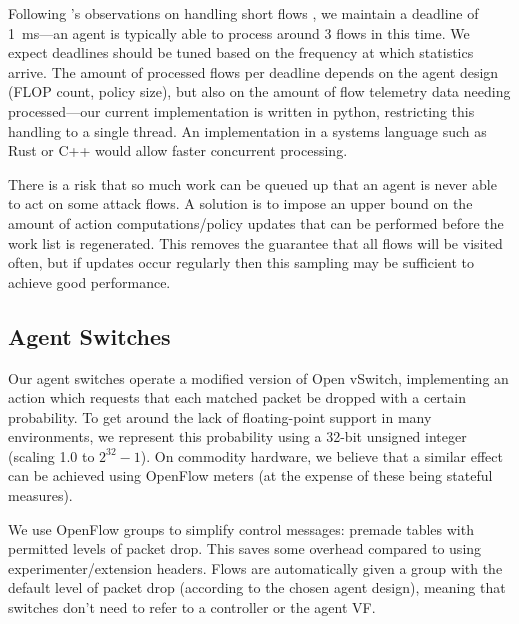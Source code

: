 \documentclass[10pt, times, conference, letterpaper]{IEEEtran}
\begin{document}
Following \citeauthor{DBLP:conf/sigcomm/ChenL0L18}'s observations on handling short flows \cite{DBLP:conf/sigcomm/ChenL0L18}, we maintain a deadline of \SI{1}{\milli\second}---an agent is typically able to process around 3 flows in this time.
We expect deadlines should be tuned based on the frequency at which statistics arrive.
The amount of processed flows per deadline depends on the agent design (FLOP count, policy size), but also on the amount of flow telemetry data needing processed---our current implementation is written in python, restricting this handling to a single thread.
An implementation in a systems language such as Rust or C++ would allow faster concurrent processing.

There is a risk that so much work can be queued up that an agent is never able to act on some attack flows.
A solution is to impose an upper bound on the amount of action computations/policy updates that can be performed before the work list is regenerated.
This removes the guarantee that all flows will be visited often, but if updates occur regularly then this sampling may be sufficient to achieve good performance.

\subsection{Agent Switches}
Our agent switches operate a modified version of Open vSwitch, implementing an action which requests that each matched packet be dropped with a certain probability.
To get around the lack of floating-point support in many environments, we represent this probability using a 32-bit unsigned integer (scaling \num{1.0} to $2^{32}-1$).
On commodity hardware, we believe that a similar effect can be achieved using OpenFlow meters (at the expense of these being stateful measures).

We use OpenFlow groups to simplify control messages: premade tables with permitted levels of packet drop.
This saves some overhead compared to using experimenter/extension headers.
Flows are automatically given a group with the default level of packet drop (according to the chosen agent design), meaning that switches don't need to refer to a controller or the agent VF.

\end{document}
